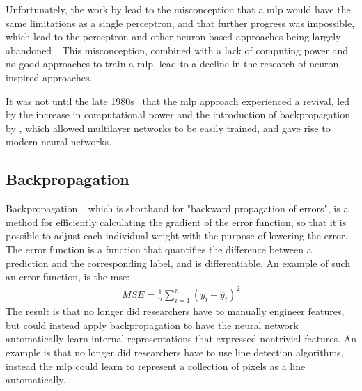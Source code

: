 \par
Unfortunately, the work by \textcite{perceptron3} lead to the misconception that a \gls*{mlp} would have the same limitations as a single perceptron, and that further progress was impossible, which lead to the perceptron and other neuron-based approaches being largely abandoned~\cite{perceptron_misconceptions}. This misconception, combined with a lack of computing power and no good approaches to train a \gls*{mlp}, lead to a decline in the research of neuron-inspired approaches.
\par
It was not until the late 1980s~\cite{perceptron_misconceptions} that the \gls*{mlp} approach experienced a revival, led by the increase in computational power and the introduction of backpropagation by \textcite{backprop}, which allowed multilayer networks to be easily trained, and gave rise to modern neural networks.
\subsection{Backpropagation}
Backpropagation~\cite{backprop}, which is shorthand for "backward propagation of errors",  is a method for efficiently calculating the gradient of the error function, so that it is possible to adjust each individual weight with the purpose of lowering the error. The error function is a function that quantifies the difference between a prediction and the corresponding label, and is differentiable. An example of such an error function, is the \gls*{mse}:
\begin{align*}
    MSE=\frac{1}{n}\sum_{i=1}^n (y_i-\hat{y}_i)^2
\end{align*}
The result is that no longer did researchers have to manually engineer features, but could instead apply backpropagation to have the neural network automatically learn internal representations that expressed nontrivial features. An example is that no longer did researchers have to use line detection algorithms, instead the \gls*{mlp} could learn to represent a collection of pixels as a line automatically.
